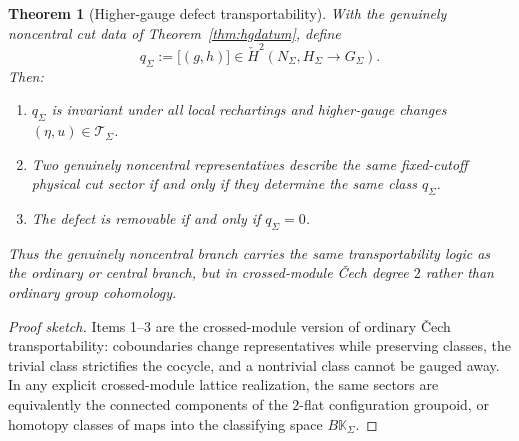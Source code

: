 \documentclass[11pt]{article}
\newtheorem{theorem}{Theorem}[section]
\begin{document}
\begin{theorem}[Higher-gauge defect transportability]\label{thm:hgtransport}
With the genuinely noncentral cut data of Theorem~\ref{thm:hgdatum}, define
\[
q_\Sigma:=\bigl[(g,h)\bigr]\in \check H^2(N_\Sigma,H_\Sigma\to G_\Sigma).
\]
Then:
\begin{enumerate}[leftmargin=2em]
\item \(q_\Sigma\) is invariant under all local rechartings and higher-gauge changes \((\eta,u)\in \mathcal T_\Sigma\).
\item Two genuinely noncentral representatives describe the same fixed-cutoff physical cut sector if and only if they determine the same class \(q_\Sigma\).
\item The defect is removable if and only if \(q_\Sigma=0\).
\end{enumerate}
Thus the genuinely noncentral branch carries the same transportability logic as the ordinary or central branch, but in crossed-module \v{C}ech degree \(2\) rather than ordinary group cohomology.
\end{theorem}

\begin{proof}[Proof sketch]
Items 1--3 are the crossed-module version of ordinary \v{C}ech transportability: coboundaries
change representatives while preserving classes, the trivial class strictifies the cocycle, and a
nontrivial class cannot be gauged away. In any explicit crossed-module lattice realization, the
same sectors are equivalently the connected components of the \(2\)-flat configuration groupoid,
or homotopy classes of maps into the classifying space \(B\mathbb K_\Sigma\).
\end{proof}
\end{document}
